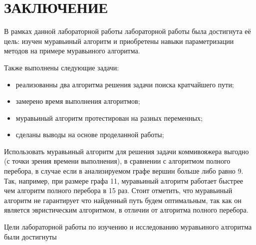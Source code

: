 \chapter*{ЗАКЛЮЧЕНИЕ}

В рамках данной лабораторной работы лабораторной работы была достигнута её цель: изучен муравьиный алгоритм и приобретены навыки параметризации методов на примере муравьиного алгоритма.

Также выполнены следующие задачи:	
\begin{itemize}
	\item реализованны два алгоритма решения задачи поиска кратчайшего пути;
	\item замерено время выполнения алгоритмов;
	\item муравьиный алгоритм протестирован на разных переменных;
	\item сделаны выводы на основе проделанной работы;
\end{itemize}

Использовать муравьиный алгоритм для решения задачи коммивояжера выгодно (с точки зрения времени выполнения),
в сравнении с алгоритмом полного перебора, в случае если в анализируемом графе вершин больше либо равно 9. 
Так, например, при размере графа 11, муравьиный алгоритм работает быстрее чем алгоритм полного перебора в 15 раз. 
Стоит отметить, что муравьиный алгоритм не гарантирует что найденный путь будем оптимальным, так как он является эвристическим алгоритмом, в отличии от алгоритма полного перебора.

\indent Цели лабораторной работы по изучению и исследованию муравьиного алгоритма были достигнуты

